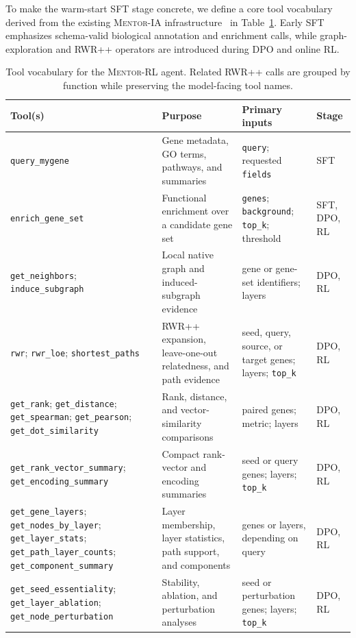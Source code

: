 \documentclass[thesis,letterpaper,12pt]{utthesis}
\begin{document}
To make the warm-start SFT stage concrete, we define a core tool vocabulary derived from the existing \textsc{Mentor-IA} infrastructure~\cite{mentor-ia} in Table~\ref{tbl:tools}. Early SFT emphasizes schema-valid biological annotation and enrichment calls, while graph-exploration and RWR++ operators are introduced during DPO and online RL.

\begin{table}[p]
\centering
\caption{Tool vocabulary for the \textsc{Mentor-RL} agent. Related RWR++ calls are grouped by function while preserving the model-facing tool names.}
\label{tbl:tools}
\scriptsize
\setlength{\tabcolsep}{3pt}
\renewcommand{\arraystretch}{0.95}
\begin{tabularx}{\textwidth}{@{}>{\raggedright\arraybackslash}p{} >{\raggedright\arraybackslash}X >{\raggedright\arraybackslash}p{} >{\raggedright\arraybackslash}p{}@{}}
\toprule
\textbf{Tool(s)} & \textbf{Purpose} & \textbf{Primary inputs} & \textbf{Stage} \\
\midrule
\texttt{query\_mygene} & Gene metadata, GO terms, pathways, and summaries & \texttt{query}; requested \texttt{fields} & SFT \\
\midrule
\texttt{enrich\_gene\_set} & Functional enrichment over a candidate gene set & \texttt{genes}; \texttt{background}; \texttt{top\_k}; threshold & SFT, DPO, RL \\
\midrule
\texttt{get\_neighbors}; \texttt{induce\_subgraph} & Local native graph and induced-subgraph evidence & gene or gene-set identifiers; layers & DPO, RL \\
\midrule
\texttt{rwr}; \texttt{rwr\_loe}; \texttt{shortest\_paths} & RWR++ expansion, leave-one-out relatedness, and path evidence & seed, query, source, or target genes; layers; \texttt{top\_k} & DPO, RL \\
\midrule
\texttt{get\_rank}; \texttt{get\_distance}; \texttt{get\_spearman}; \texttt{get\_pearson}; \texttt{get\_dot\_similarity} & Rank, distance, and vector-similarity comparisons & paired genes; metric; layers & DPO, RL \\
\midrule
\texttt{get\_rank\_vector\_summary}; \texttt{get\_encoding\_summary} & Compact rank-vector and encoding summaries & seed or query genes; layers; \texttt{top\_k} & DPO, RL \\
\midrule
\texttt{get\_gene\_layers}; \texttt{get\_nodes\_by\_layer}; \texttt{get\_layer\_stats}; \texttt{get\_path\_layer\_counts}; \texttt{get\_component\_summary} & Layer membership, layer statistics, path support, and components & genes or layers, depending on query & DPO, RL \\
\midrule
\texttt{get\_seed\_essentiality}; \texttt{get\_layer\_ablation}; \texttt{get\_node\_perturbation} & Stability, ablation, and perturbation analyses & seed or perturbation genes; layers; \texttt{top\_k} & DPO, RL \\
\bottomrule
\end{tabularx}
\end{table}
\end{document}
